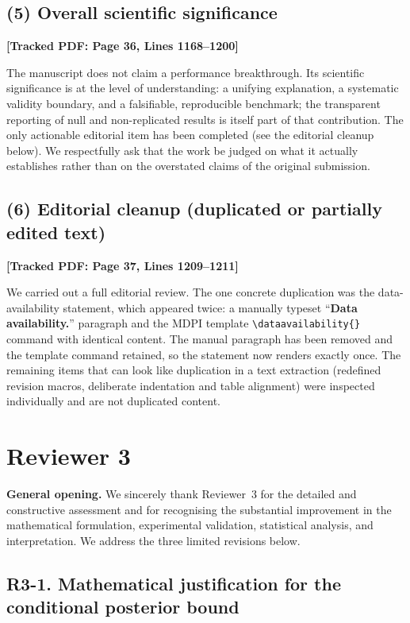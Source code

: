 \documentclass[11pt]{article}
\newcommand{\loc}[1]{\textbf{[\textcolor{revblue}{Tracked PDF: #1}]}}
\begin{document}
\subsection*{(5) Overall scientific significance}
\loc{Page 36, Lines 1168--1200}

The manuscript does not claim a performance breakthrough. Its scientific
significance is at the level of understanding: a unifying explanation, a
systematic validity boundary, and a falsifiable, reproducible benchmark; the
transparent reporting of null and non-replicated results is itself part of
that contribution. The only actionable editorial item has been completed (see
the editorial cleanup below). We respectfully ask that the work be judged on
what it actually establishes rather than on the overstated claims of the
original submission.

\subsection*{(6) Editorial cleanup (duplicated or partially edited text)}
\loc{Page 37, Lines 1209--1211}

We carried out a full editorial review. The one concrete duplication was the
data-availability statement, which appeared twice: a manually typeset
``\textbf{Data availability.}'' paragraph and the MDPI template
\texttt{\textbackslash dataavailability\{\}} command with identical content.
The manual paragraph has been removed and the template command retained, so
the statement now renders exactly once. The remaining items that can look like
duplication in a text extraction (redefined revision macros, deliberate
indentation and table alignment) were inspected individually and are not
duplicated content.

\section*{Reviewer 3}

\textbf{General opening.} We sincerely thank Reviewer~3 for the detailed and
constructive assessment and for recognising the substantial improvement in the
mathematical formulation, experimental validation, statistical analysis, and
interpretation. We address the three limited revisions below.

\subsection*{R3-1. Mathematical justification for the conditional posterior bound}
\end{document}
